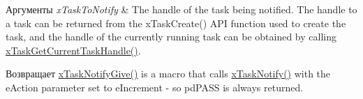 \begin{DoxyParams}{Аргументы}
{\em x\+Task\+To\+Notify} & The handle of the task being notified. The handle to a task can be returned from the x\+Task\+Create() A\+PI function used to create the task, and the handle of the currently running task can be obtained by calling \mbox{\hyperlink{task_8h_a85a0f9c9f817b18686efbf8f37c72dfc}{x\+Task\+Get\+Current\+Task\+Handle()}}.\\
\hline
\end{DoxyParams}
\begin{DoxyReturn}{Возвращает}
\mbox{\hyperlink{task_8h_ac60cbd05577a3e4f3c3587dd9b213930}{x\+Task\+Notify\+Give()}} is a macro that calls \mbox{\hyperlink{task_8h_a0d2d54fb8a64011dfbb54983e4ed06bd}{x\+Task\+Notify()}} with the e\+Action parameter set to e\+Increment -\/ so pd\+P\+A\+SS is always returned. 
\end{DoxyReturn}

